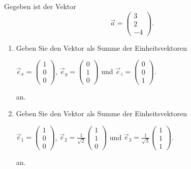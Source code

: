 \begin{ExerciseBlock}
Gegeben ist der Vektor \[\vec{a}=\left(\begin{array}{c} 3 \\ 2 \\ -4 \end{array}\right).\]
\begin{enumerate}[label=\alph*)]
	\item Geben Sie den Vektor als Summe der Einheitsvektoren 
	\begin{center}
	$\vec{e}_x = \left(\begin{array}{c} 1\\0\\0 \end{array}\right)$, 
	$\vec{e}_y = \left(\begin{array}{c} 0\\1\\0 \end{array}\right)$ und
	$\vec{e}_z = \left(\begin{array}{c} 0\\0\\1 \end{array}\right)$.
	\end{center}
	an.
	\item Geben Sie den Vektor als Summe der Einheitsvektoren 
	\begin{center}
	$\vec{e}_1 = \left(\begin{array}{c} 1\\0\\0 \end{array}\right)$, 
	$\vec{e}_2 = \frac{1}{\sqrt{2}} \left(\begin{array}{c} 1\\1\\0 \end{array}\right)$ und $\vec{e}_3 = \frac{1}{\sqrt{3}} \left(\begin{array}{c} 1\\1\\1 \end{array}\right)$.
	\end{center}
	an.
\end{enumerate} 

\end{ExerciseBlock}
